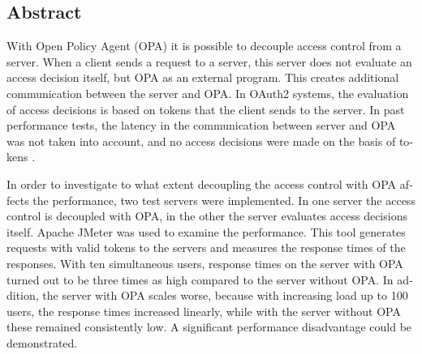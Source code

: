 

\begin{otherlanguage}{american}
	\chapter*{Abstract}

	With Open Policy Agent (OPA) it is possible to decouple access control from a server. When a client sends a request to a server, this server does not evaluate an access decision itself, but OPA as an external program. This creates additional communication between the server and OPA. In OAuth2 systems, the evaluation of access decisions is based on tokens that the client sends to the server. In past performance tests, the latency in the communication between server and OPA was not taken into account, and no access decisions were made on the basis of tokens \citep{opaperformance:2021:07}.\smallskip

	In order to investigate to what extent decoupling the access control with OPA affects the performance, two test servers were implemented. In one server the access control is decoupled with OPA, in the other the server evaluates access decisions itself. Apache JMeter was used to examine the performance. This tool generates requests with valid tokens to the servers and measures the response times of the responses. With ten simultaneous users, response times on the server with OPA turned out to be three times as high compared to the server without OPA. In addition, the server with OPA scales worse, because with increasing load up to 100 users, the response times increased linearly, while with the server without OPA these remained consistently low. A significant performance disadvantage could be demonstrated.


\end{otherlanguage}
